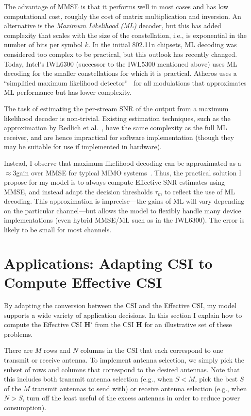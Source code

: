 The advantage of MMSE is that it performs well in most cases and has low computational cost, roughly the cost of matrix multiplication and inversion. An alternative is the \emph{Maximum Likelihood (ML)} decoder, but this has added complexity that scales with the size of the constellation, i.e., is exponential in the number of bits per symbol $k$. In the initial 802.11n chipsets, ML decoding was considered too complex to be practical, but this outlook has recently changed. Today, Intel's IWL6300 (successor to the IWL5300 mentioned above) uses ML decoding for the smaller constellations for which it is practical. Atheros uses a ``simplified maximum likelihood detector''~\cite{ar6004,Atheros_11nTechPaper} for all modulations that approximates ML performance but has lower complexity.

The task of estimating the per-stream SNR of the output from a maximum likelihood decoder is non-trivial. Existing estimation techniques, such as the approximation by Redlich et al.~\cite{Redlich_MLSNR}, have the same complexity as the full ML receiver, and are hence impractical for software implementation (though they may be suitable for use if implemented in hardware).

Instead, I observe that maximum likelihood decoding can be approximated as a $\approx$3\dB gain over MMSE for typical MIMO systems~\cite{Kumar_ml_mmse}. Thus, the practical solution I propose for my model is to always compute Effective SNR estimates using MMSE, and instead adapt the decision thresholds $\tau_m$ to reflect the use of ML decoding. This approximation is imprecise---the gains of ML will vary depending on the particular channel---but allows the model to flexibly handle many device implementations (even hybrid MMSE/ML such as in the IWL6300). The error is likely to be small for most channels.

\section{Applications: Adapting CSI to Compute Effective CSI}
By adapting the conversion between the CSI and the Effective CSI, my model supports a wide variety of application decisions. In this section I explain how to compute the Effective CSI $\mathbf{H}'$ from the CSI $\mathbf{H}$ for an illustrative set of these problems.

 There are $M$ rows and $N$ columns in the CSI that each correspond to one transmit or receive antenna. To implement antenna selection, we simply pick the subset of rows and columns that correspond to the desired antennas. Note that this includes both transmit antenna selection (e.g., when $S<M$, pick the best $S$ of the $M$ transmit antennas to send with) or receive antenna selection (e.g., when $N>S$, turn off the least useful of the excess antennas in order to reduce power consumption).


